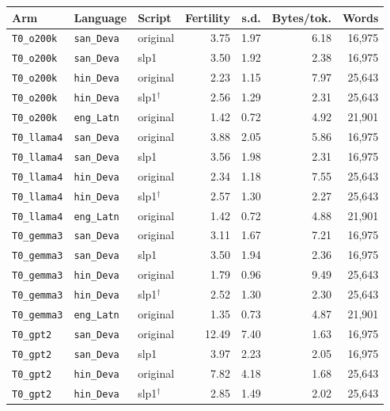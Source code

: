 \begin{table}[t]
\centering
\footnotesize
\begin{tabular}{lllrrrr}
\toprule
Arm & Language & Script & Fertility & s.d. & Bytes/tok. & Words \\
\midrule
\texttt{T0\_o200k} & \texttt{san\_Deva} & original & 3.75 & 1.97 & 6.18 & 16,975 \\
\texttt{T0\_o200k} & \texttt{san\_Deva} & slp1 & 3.50 & 1.92 & 2.38 & 16,975 \\
\texttt{T0\_o200k} & \texttt{hin\_Deva} & original & 2.23 & 1.15 & 7.97 & 25,643 \\
\texttt{T0\_o200k} & \texttt{hin\_Deva} & slp1$^{\dagger}$ & 2.56 & 1.29 & 2.31 & 25,643 \\
\texttt{T0\_o200k} & \texttt{eng\_Latn} & original & 1.42 & 0.72 & 4.92 & 21,901 \\
\texttt{T0\_llama4} & \texttt{san\_Deva} & original & 3.88 & 2.05 & 5.86 & 16,975 \\
\texttt{T0\_llama4} & \texttt{san\_Deva} & slp1 & 3.56 & 1.98 & 2.31 & 16,975 \\
\texttt{T0\_llama4} & \texttt{hin\_Deva} & original & 2.34 & 1.18 & 7.55 & 25,643 \\
\texttt{T0\_llama4} & \texttt{hin\_Deva} & slp1$^{\dagger}$ & 2.57 & 1.30 & 2.27 & 25,643 \\
\texttt{T0\_llama4} & \texttt{eng\_Latn} & original & 1.42 & 0.72 & 4.88 & 21,901 \\
\texttt{T0\_gemma3} & \texttt{san\_Deva} & original & 3.11 & 1.67 & 7.21 & 16,975 \\
\texttt{T0\_gemma3} & \texttt{san\_Deva} & slp1 & 3.50 & 1.94 & 2.36 & 16,975 \\
\texttt{T0\_gemma3} & \texttt{hin\_Deva} & original & 1.79 & 0.96 & 9.49 & 25,643 \\
\texttt{T0\_gemma3} & \texttt{hin\_Deva} & slp1$^{\dagger}$ & 2.52 & 1.30 & 2.30 & 25,643 \\
\texttt{T0\_gemma3} & \texttt{eng\_Latn} & original & 1.35 & 0.73 & 4.87 & 21,901 \\
\texttt{T0\_gpt2} & \texttt{san\_Deva} & original & 12.49 & 7.40 & 1.63 & 16,975 \\
\texttt{T0\_gpt2} & \texttt{san\_Deva} & slp1 & 3.97 & 2.23 & 2.05 & 16,975 \\
\texttt{T0\_gpt2} & \texttt{hin\_Deva} & original & 7.82 & 4.18 & 1.68 & 25,643 \\
\texttt{T0\_gpt2} & \texttt{hin\_Deva} & slp1$^{\dagger}$ & 2.85 & 1.49 & 2.02 & 25,643 \\

\end{tabular}
\end{table}
